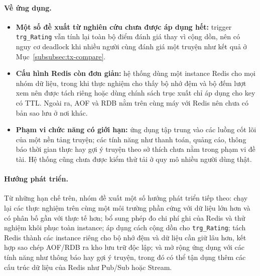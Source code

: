 \paragraph{Về ứng dụng.}
\begin{itemize}
    \item \textbf{Một số đề xuất từ nghiên cứu chưa được áp dụng hết:} trigger \texttt{trg\_Rating} vẫn tính lại toàn bộ điểm đánh giá thay vì cộng dồn, nên có nguy cơ deadlock khi nhiều người cùng đánh giá một truyện như kết quả ở Mục~\ref{subsubsec:tx-compare}.
    \item \textbf{Cấu hình Redis còn đơn giản:} hệ thống dùng một instance Redis cho mọi nhóm dữ liệu, trong khi thực nghiệm cho thấy bộ nhớ đệm và bộ đếm lượt xem nên được tách riêng hoặc dùng chính sách trục xuất chỉ áp dụng cho key có TTL. Ngoài ra, AOF và RDB nằm trên cùng máy với Redis nên chưa có bản sao lưu ở nơi khác.
    \item \textbf{Phạm vi chức năng có giới hạn:} ứng dụng tập trung vào các luồng cốt lõi của một nền tảng truyện; các tính năng như thanh toán, quảng cáo, thông báo thời gian thực hay gợi ý truyện theo sở thích chưa nằm trong phạm vi đề tài. Hệ thống cũng chưa được kiểm thử tải ở quy mô nhiều người dùng thật.
\end{itemize}

\paragraph{Hướng phát triển.} Từ những hạn chế trên, nhóm đề xuất một số hướng phát triển tiếp theo: chạy lại các thực nghiệm trên cùng một môi trường phần cứng với dữ liệu lớn hơn và có phân bố gần với thực tế hơn; bổ sung phép đo chi phí ghi của Redis và thử nghiệm khôi phục toàn instance; áp dụng cách cộng dồn cho \texttt{trg\_Rating}; tách Redis thành các instance riêng cho bộ nhớ đệm và dữ liệu cần giữ lâu hơn, kết hợp sao chép AOF/RDB ra kho lưu trữ độc lập; và mở rộng ứng dụng với các tính năng như thông báo hay gợi ý truyện, trong đó có thể tận dụng thêm các cấu trúc dữ liệu của Redis như Pub/Sub hoặc Stream.
